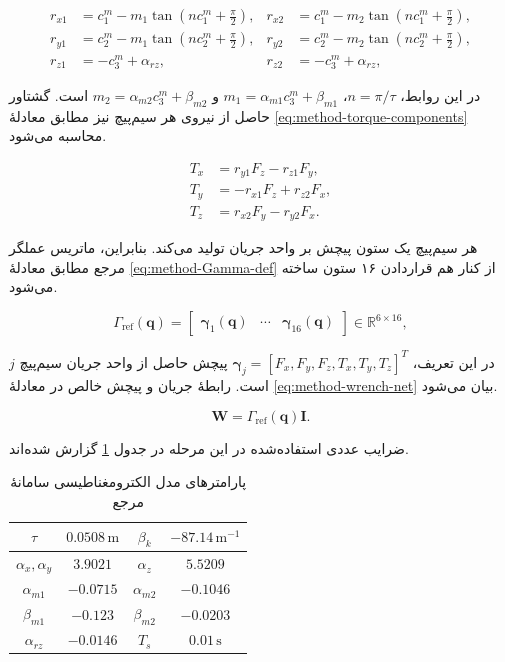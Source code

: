 \begin{align}
	r_{x1}&=c_1^m-m_1\tan\left(nc_1^m+\frac{\pi}{2}\right), & r_{x2}&=c_1^m-m_2\tan\left(nc_1^m+\frac{\pi}{2}\right),\\
	r_{y1}&=c_2^m-m_1\tan\left(nc_2^m+\frac{\pi}{2}\right), & r_{y2}&=c_2^m-m_2\tan\left(nc_2^m+\frac{\pi}{2}\right),\\
	r_{z1}&=-c_3^m+\alpha_{rz}, & r_{z2}&=-c_3^m+\alpha_{rz},
	\label{eq:method-effective-arms}
\end{align}

در این روابط، $n=\pi/\tau$، $m_1=\alpha_{m1}c_3^m+\beta_{m1}$ و $m_2=\alpha_{m2}c_3^m+\beta_{m2}$ است. گشتاور حاصل از نیروی هر سیم‌پیچ نیز مطابق معادلهٔ \ref{eq:method-torque-components} محاسبه می‌شود.

\begin{align}
	T_x&=r_{y1}F_z-r_{z1}F_y,\\
	T_y&=-r_{x1}F_z+r_{z2}F_x,\\
	T_z&=r_{x2}F_y-r_{y2}F_x.
	\label{eq:method-torque-components}
\end{align}

هر سیم‌پیچ یک ستون پیچش بر واحد جریان تولید می‌کند. بنابراین، ماتریس عملگر مرجع مطابق معادلهٔ \ref{eq:method-Gamma-def} از کنار هم قراردادن ۱۶ ستون ساخته می‌شود.

\begin{equation}
	\Gamma_{\mathrm{ref}}(\mathbf q)=
	\begin{bmatrix}\boldsymbol{\gamma}_1(\mathbf q)&\cdots&\boldsymbol{\gamma}_{16}(\mathbf q)\end{bmatrix}
	\in\mathbb R^{6\times16},
	\label{eq:method-Gamma-def}
\end{equation}

در این تعریف، $\boldsymbol{\gamma}_j=[F_x,F_y,F_z,T_x,T_y,T_z]^T$ پیچش حاصل از واحد جریان سیم‌پیچ $j$ است. رابطهٔ جریان و پیچش خالص در معادلهٔ \ref{eq:method-wrench-net} بیان می‌شود.

\begin{equation}
	\mathbf W=\Gamma_{\mathrm{ref}}(\mathbf q)\mathbf I.
	\label{eq:method-wrench-net}
\end{equation}

ضرایب عددی استفاده‌شده در این مرحله در جدول \ref{tab:method-parameters} گزارش شده‌اند.

\begin{table}[!htbp]
	\centering
	\caption{پارامترهای مدل الکترومغناطیسی سامانهٔ مرجع}
	\label{tab:method-parameters}
	\begin{tabular}{|c|c||c|c|}
		\hline
		$\tau$ & $0.0508\,\mathrm m$ & $\beta_k$ & $-87.14\,\mathrm{m^{-1}}$\\ \hline
		$\alpha_x,\alpha_y$ & $3.9021$ & $\alpha_z$ & $5.5209$\\ \hline
		$\alpha_{m1}$ & $-0.0715$ & $\alpha_{m2}$ & $-0.1046$\\ \hline
		$\beta_{m1}$ & $-0.123$ & $\beta_{m2}$ & $-0.0203$\\ \hline
		$\alpha_{rz}$ & $-0.0146$ & $T_s$ & $0.01\,\mathrm s$\\ \hline
	\end{tabular}
\end{table}

